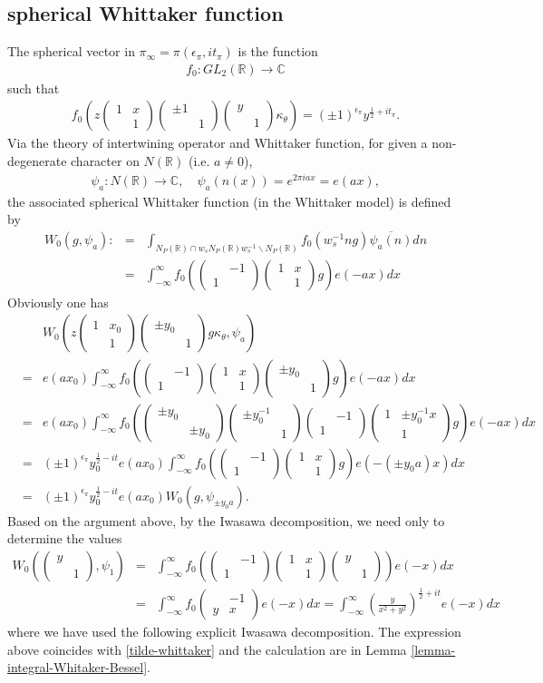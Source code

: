 \documentclass[11pt,reqno]{amsart}
\newcommand{\bna}{\begin{eqnarray*}}
\newcommand{\ena}{\end{eqnarray*}}
\newcommand{\bma}{\begin{pmatrix}}
\newcommand{\ema}{\end{pmatrix}}
\def\C{\mathbb{C}}
\def\R{\mathbb{R}}
\theoremstyle{definition}
\begin{document}
\subsection{spherical Whittaker function}
The spherical vector in $\pi_\infty=\pi(\epsilon_\pi,it_\pi)$ is the function
\bna
f_0:GL_2(\R)\rightarrow\C
\ena
such that
\bna
f_0\left(z\bma 1&x\\&1\ema
\bma\pm 1\\&1\ema\bma
y\\&1\ema\kappa_\theta\right)
=(\pm 1)^{\epsilon_\pi}y^{\frac{1}{2}+it_\pi}.
\ena
Via the theory of intertwining operator and Whittaker function,
 for given a non-degenerate character on $N(\R)$ (i.e. $a\neq 0$),
\bna
\psi_a:N(\R)\rightarrow\C,\quad \psi_a(n(x))=e^{2\pi iax}=e(ax),
\ena
the associated spherical Whittaker function (in the Whittaker model) is defined by
\bna
W_0(g,\psi_a):&=&\int_{N_P(\R)\cap w_sN_P(\R)w_s^{-1}\backslash N_P(\R)}
f_0(w_s^{-1}n g)\overline{\psi_a(n)}dn\\
&=&\int_{-\infty}^{\infty}f_0\left(\bma&-1\\1\ema \bma1&x\\&1\ema  g
\right)e(-ax)dx
\ena
Obviously one has
\bna
&&W_0\left(z\bma 1&x_0\\&1\ema\bma \pm y_0\\&1\ema
g\kappa_\theta,\psi_{a}\right)\\
&=&e(ax_0)
\int_{-\infty}^\infty f_0
\left(\bma&-1\\1\ema \bma1&x\\&1\ema \bma \pm y_0\\&1\ema
g\right)e(-ax)dx\\
&=&e(ax_0)
\int_{-\infty}^\infty f_0
\left(\bma \pm y_0\\&\pm y_0\ema
\bma \pm y_0^{-1}\\&1\ema
\bma&-1\\1\ema \bma1&\pm y_0^{-1}x\\&1\ema
g\right)e(-ax)dx\\
&=&(\pm 1)^{\epsilon_\pi}y_0^{\frac{1}{2}-it}
e(ax_0)
\int_{-\infty}^\infty f_0
\left(
\bma&-1\\1\ema \bma1&x\\&1\ema
g\right)e(-(\pm y_0a)x)dx\\
&=&(\pm 1)^{\epsilon_\pi}y_0^{\frac{1}{2}-it}
e(ax_0)W_0(g,\psi_{\pm y_0 a}).
\ena
Based on the argument above, by the Iwasawa decomposition,
we need only to determine the values
\bna
W_0\left(\bma y&\\&1\ema,\psi_1\right)&=&\int_{-\infty}^\infty
f_0\left(\bma &-1\\ 1\ema\bma 1&x\\&1\ema\bma y\\&1\ema\right)e(-x)dx\\
&=&
\int_{-\infty}^\infty
f_0\bma &-1\\ y&x\ema e(-x)dx
=\int_{-\infty}^\infty\left(\frac{y}{x^2+y^2}\right)^{\frac{1}{2}+it}e(-x)dx
\ena
where we have used the following explicit Iwasawa decomposition.
The expression above coincides with \eqref{tilde-whittaker}
 and the calculation are in Lemma \ref{lemma-integral-Whitaker-Bessel}.
\end{document}
